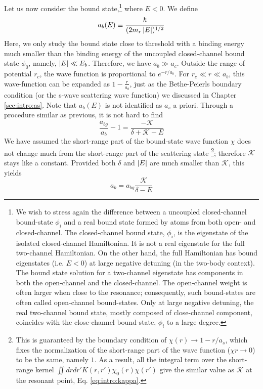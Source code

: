 Let us now consider the bound state,\footnote{We wish to stress again the difference between a uncoupled closed-channel bound-state $\phi_{i}$ and a real bound state  formed by atoms from both open- and closed-channel.   The closed-channel bound state, $\phi_{i}$, is the eigenstate of the  isolated closed-channel Hamiltonian.  It is not a real eigenstate for the full two-channel Hamiltonian.  On the other hand, the full  Hamiltonian has bound eigenstates (i.e. $E<0$) at large negative detuning (in the two-body context).  The bound state solution for a two-channel eigenstate has components in both the open-channel and the closed-channel.  The open-channel weight is often larger when close to the resonance; consequently, such bound-states are often called open-channel bound-states.  Only at large negative detuning, the real two-channel bound state, mostly composed of close-channel component, coincides with the close-channel bound-state, $\phi_{i}$ to a large degree.}
where $E<0$.  We define
\begin{equation}\label{eq:intro:ab}
a_{b}(E)\equiv\frac{\hbar}{(2m_{r}\left\lvert{E}\right\rvert)^{1/2}}
\end{equation}
 Here, we only study the bound state close to threshold with a binding energy much smaller than the binding energy of the uncoupled closed-channel bound state $\phi_{0}$, namely, $\left\lvert{E}\right\rvert\ll{}E_{b}$.  Therefore, we have  $a_{b}\gg{a_{c}}$.  Outside the range of potential $r_{c}$,  the wave function is proportional to $e^{-r/a_{b}}$. For $r_{c}\ll{}r\ll{}a_{b}$, this wave-function can be expanded as  $1-\frac{r}{a_{b}}$, just as the Bethe-Peierls boundary condition (or the s-wave scattering wave function) we discussed in Chapter \ref{sec:intro:as}.  Note that $a_{b}(E)$ is not identified as $a_{s}$ a priori.  Through a  procedure similar as previous,  it is not hard to find
\begin{equation}
\frac{a_{bg}}{a_{b}}-1=\frac{-\mathcal{K}}{\delta+\mathcal{K}-E}
\end{equation}
We have assumed the short-range part of the bound-state wave function $\chi$ does not change much from the short-range part of the scattering state \footnote{This is guaranteed by the boundary condition of $\chi(r)\to1-r/a_{s}$, which fixes the normalization of the short-range part of the wave function ($\chi{r\to0}$) to be the same, namely $1$. As a result, all the integral term over the short-range kernel $\iint{drdr'}K(r,r')\chi_{0}(r)\chi(r')$  give the similar value as  $\mathcal{K}$ at the resonant point, Eq. \ref{eq:intro:kappa}.};  therefore $\mathcal{K}$ stays like a constant.  Provided both $\delta$ and $\left\lvert{E}\right\rvert$ are much smaller than $\mathcal{K}$, this yields\begin{equation}\label{eq:intro:abKE}
a_{b}=a_{bg}\frac{\mathcal{K}}{\delta-E}
\end{equation}
